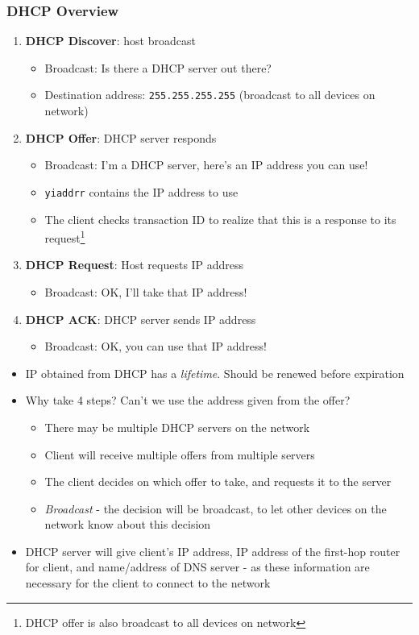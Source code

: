 \subsubsection{DHCP Overview}
\begin{enumerate}
	\item \textbf{DHCP Discover}: host broadcast
	\begin{itemize}
		\item Broadcast: Is there a DHCP server out there?
		\item Destination address: \texttt{255.255.255.255} (broadcast to all devices on network)
	\end{itemize}
	\item \textbf{DHCP Offer}: DHCP server responds
	\begin{itemize}
		\item Broadcast: I'm a DHCP server, here's an IP address you can use!
		\item \texttt{yiaddrr} contains the IP address to use
		\item The client checks transaction ID to realize that this is a response to its request\footnote{DHCP offer is also broadcast to all devices on network}
	\end{itemize}
	\item \textbf{DHCP Request}: Host requests IP address
	\begin{itemize}
		\item Broadcast: OK, I'll take that IP address!
	\end{itemize}
	\item \textbf{DHCP ACK}: DHCP server sends IP address
	\begin{itemize}
		\item Broadcast: OK, you can use that IP address!
	\end{itemize}
\end{enumerate}
\begin{itemize}
	\item IP obtained from DHCP has a \textit{lifetime}. Should be renewed before expiration
	\item Why take 4 steps? Can't we use the address given from the offer?
	\begin{itemize}
		\item There may be multiple DHCP servers on the network
		\item Client will receive multiple offers from multiple servers
		\item The client decides on which offer to take, and requests it to the server
		\item \textit{Broadcast} - the decision will be broadcast, to let other devices on the network know about this decision
	\end{itemize}
	\item DHCP server will give client's IP address, IP address of the first-hop router for client, and name/address of DNS server - as these information are necessary for the client to connect to the network
\end{itemize}

